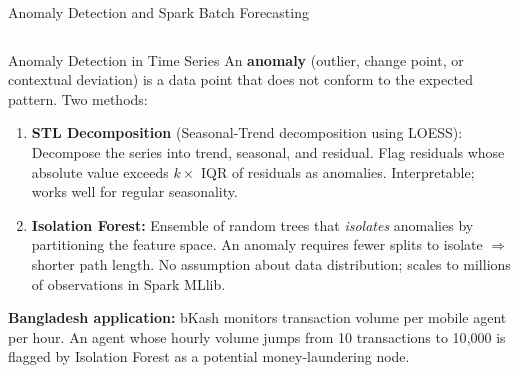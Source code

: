 \documentclass[aspectratio=169,10pt]{beamer}
\begin{document}
\begin{frame}{Anomaly Detection and Spark Batch Forecasting}
  \begin{columns}[T]
      \begin{block}{Anomaly Detection in Time Series}
        An \textbf{anomaly} (outlier, change point, or contextual deviation) is a data point that does not conform to the expected pattern.  Two methods:
        \vspace{4pt}
        \begin{enumerate}
          \item \textbf{STL Decomposition} (Seasonal-Trend decomposition using LOESS):  Decompose the series into trend, seasonal, and residual.  Flag residuals whose absolute value exceeds $k \times$ IQR of residuals as anomalies.  Interpretable; works well for regular seasonality.
          \vspace{2pt}
          \item \textbf{Isolation Forest:}  Ensemble of random trees that \textit{isolates} anomalies by partitioning the feature space.  An anomaly requires fewer splits to isolate $\Rightarrow$ shorter path length.  No assumption about data distribution; scales to millions of observations in Spark MLlib.
        \end{enumerate}
        \vspace{4pt}
        \textbf{Bangladesh application:} bKash monitors transaction volume per mobile agent per hour.  An agent whose hourly volume jumps from 10 transactions to 10{,}000 is flagged by Isolation Forest as a potential money-laundering node.
      \end{block}


\end{columns}
\end{frame}
\end{document}

